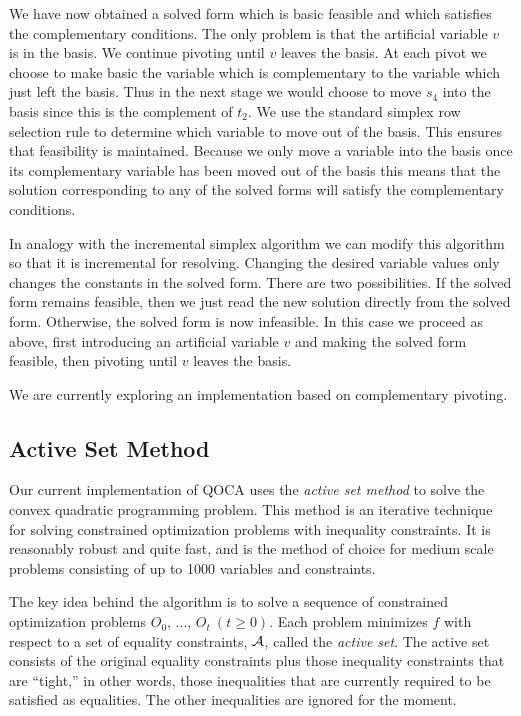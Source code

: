 \documentclass{article}
\begin{document}
We have now obtained a solved form which is basic feasible and which
satisfies the complementary conditions. The only problem is that the
artificial variable $v$ is in the basis. We continue pivoting until $v$
leaves the basis. At each pivot we choose to make basic the
variable which is complementary to the variable which just left the basis.
Thus in the next stage we would choose to move $s_4$ into the basis since
this is the complement of $t_2$. We use the standard simplex row selection
rule to determine which variable to move out of the basis. This ensures
that feasibility is maintained. Because we only move a variable into the basis
once its complementary variable has been moved out of the basis this means that
the solution corresponding to any of the solved forms will satisfy
the complementary conditions.

In analogy with the incremental simplex algorithm
we can modify this algorithm so that it is incremental for resolving.
Changing the desired variable values only changes the constants
in the solved form. There are two possibilities. If the solved form
remains feasible, then we just read the new solution directly from the
solved form. Otherwise, the solved form is now infeasible. In this
case we proceed as above, first introducing an artificial variable
$v$ and making the solved form feasible, then pivoting until $v$
leaves the basis.

We are currently exploring an implementation based on complementary pivoting.

\subsection{Active Set Method}
\label{active-sets}

Our current implementation of QOCA uses the {\em active set method}
\cite{fletcher-book} to solve the convex quadratic programming problem.
This method is an iterative technique for solving constrained optimization
problems with inequality constraints.  It is reasonably robust and quite
fast, and is the method of choice for medium scale problems consisting of
up to 1000 variables and constraints.

The key idea behind the algorithm is to solve a sequence of constrained
optimization problems $O_0$, ..., $O_t \ (t \geq 0)$.  
Each problem minimizes $f$ with
respect to a set of equality constraints, ${\cal A}$, called the {\em
active set}.  The active set consists of the original equality constraints
plus those inequality constraints that are ``tight,'' in other words, those
inequalities that are currently required to be satisfied as
equalities. The other inequalities are ignored for the moment.
\end{document}
